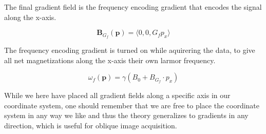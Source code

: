 The final gradient field is the frequency encoding gradient that
encodes the signal along the x-axis.

\begin{displaymath}
  \mathbf{B}_{G_f}(\mathbf{p}) = \langle 0, 0, G_f p_x \rangle
\end{displaymath}

The frequency encoding gradient is turned on while aquirering the
data, to give all net magnetizations along the x-axis their own larmor
frequency.

\begin{displaymath}
  \omega_f(\mathbf{p}) = \gamma (B_0 + B_{G_f} \cdot p_x)
\end{displaymath}


While we here have placed all gradient fields along a specific axis in
our coordinate system, one should remember that we are free to place
the coordinate system in any way we like and thus the theory
generalizes to gradients in any direction, which is useful for oblique
image acquisition.




